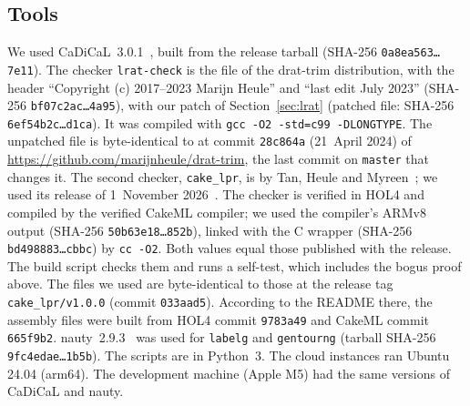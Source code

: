\documentclass[11pt]{amsart}
\theoremstyle{definition}
\theoremstyle{remark}
\begin{document}
\subsection{Tools}\label{sec:tools}
We used CaDiCaL~3.0.1~\cite{Bie18,CaDiCaL2}, built from the release tarball
(SHA-256 \texttt{0a8ea563\ldots{}7e11}). The checker \texttt{lrat-check} is the
file  of the drat-trim distribution, with the header
``Copyright (c) 2017--2023 Marijn Heule'' and ``last edit July 2023''
(SHA-256 \texttt{bf07c2ac\ldots{}4a95}), with our patch of
Section~\ref{sec:lrat} (patched file: SHA-256 \texttt{6ef54b2c\ldots{}d1ca}).
It was compiled with \texttt{gcc -O2 -std=c99 -DLONGTYPE}.
The unpatched file is byte-identical to  at commit
\texttt{28c864a} (21~April 2024) of
\url{https://github.com/marijnheule/drat-trim}, the last commit on
\texttt{master} that changes it.
The second checker, \texttt{cake\_lpr}, is by Tan, Heule and
Myreen~\cite{THM21}; we used its release of 1~November 2026~\cite{cakelprrepo}.
The checker is verified in HOL4 and compiled by the verified CakeML compiler;
we used the compiler's ARMv8 output  (SHA-256
\texttt{50b63e18\ldots{}852b}), linked with the C wrapper 
(SHA-256 \texttt{bd498883\ldots{}cbbc}) by \texttt{cc -O2}. Both values equal
those published with the release. The build script checks them and runs a
self-test, which includes the bogus proof above.
The files we used are byte-identical to those at the release tag
\texttt{cake\_lpr/v1.0.0} (commit \texttt{033aad5}). According to the README
there, the assembly files were built from HOL4 commit \texttt{9783a49} and
CakeML commit \texttt{665f9b2}.
nauty~2.9.3~\cite{MP14} was used for \texttt{labelg} and \texttt{gentourng}
(tarball SHA-256 \texttt{9fc4edae\ldots{}1b5b}). The scripts are in Python~3.
The cloud instances ran Ubuntu 24.04 (arm64). The development machine (Apple
M5) had the same versions of CaDiCaL and nauty.
\end{document}
